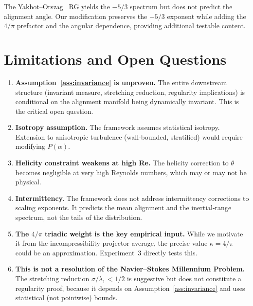 \documentclass[12pt,a4paper]{article}
\begin{document}
The Yakhot--Orszag~\cite{Yakhot1986} RG yields the $-5/3$ spectrum but does not predict the alignment angle.
Our modification preserves the $-5/3$ exponent while adding the $4/\pi$ prefactor and the angular dependence, providing additional testable content.

\section{Limitations and Open Questions}
\label{sec:limitations}

\begin{enumerate}
\item \textbf{Assumption~\ref{ass:invariance} is unproven.}
The entire downstream structure (invariant measure, stretching reduction, regularity implications) is conditional on the alignment manifold being dynamically invariant.
This is the critical open question.

\item \textbf{Isotropy assumption.}
The framework assumes statistical isotropy.
Extension to anisotropic turbulence (wall-bounded, stratified) would require modifying $P(\alpha)$.

\item \textbf{Helicity constraint weakens at high Re.}
The helicity correction to $\theta$ becomes negligible at very high Reynolds numbers, which may or may not be physical.

\item \textbf{Intermittency.}
The framework does not address intermittency corrections to scaling exponents.
It predicts the mean alignment and the inertial-range spectrum, not the tails of the distribution.

\item \textbf{The $4/\pi$ triadic weight is the key empirical input.}
While we motivate it from the incompressibility projector average, the precise value $\kappa = 4/\pi$ could be an approximation.
Experiment~3 directly tests this.

\item \textbf{This is not a resolution of the Navier--Stokes Millennium Problem.}
The stretching reduction $\sigma/\lambda_1 < 1/2$ is suggestive but does not constitute a regularity proof, because it depends on Assumption~\ref{ass:invariance} and uses statistical (not pointwise) bounds.
\end{enumerate}
\end{document}
